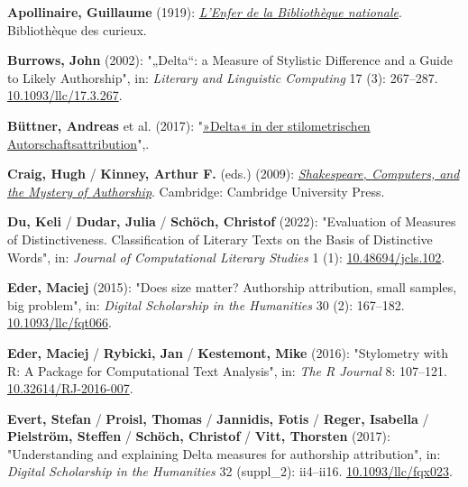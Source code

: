 \documentclass[
  12pt,
  letterpaper,
]{classicthesis}
\newlength{\cslhangindent}
\newenvironment{CSLReferences}[2] %
 {\begin{list}{}{%
  \setlength{\itemindent}{0pt}
  \setlength{\leftmargin}{0pt}
  \setlength{\parsep}{0pt}
  \ifodd #1
   \setlength{\leftmargin}{\cslhangindent}
   \setlength{\itemindent}{-1\cslhangindent}
  \fi
  \setlength{\itemsep}{#2\baselineskip}}}
 {\end{list}}
\begin{document}
\label{refs}
\begin{CSLReferences}{1}{0}
\textbf{Apollinaire, Guillaume} (1919):
\emph{\href{https://fr.wikisource.org/wiki/Livre:Apollinaire_-_L\%E2\%80\%99Enfer_de_la_Biblioth\%C3\%A8que_nationale.djvu}{L'{Enfer}
de la {Bibliothèque} nationale}}. Bibliothèque des curieux.

\textbf{Burrows, John} (2002): "{„{Delta}``}: a {Measure} of {Stylistic}
{Difference} and a {Guide} to {Likely} {Authorship}", in: \emph{Literary
and Linguistic Computing} 17 (3): 267--287.
\href{https://doi.org/10.1093/llc/17.3.267}{10.1093/llc/17.3.267}.

\textbf{Büttner, Andreas} et al. (2017):
"\href{http://dx.doi.org/10.17175/2017_006}{»{Delta}« in der
stilometrischen {Autorschaftsattribution}}",.

\textbf{Craig, Hugh} / \textbf{Kinney, Arthur F.} (eds.) (2009):
\emph{\href{https://doi.org/10.1017/CBO9780511605437}{Shakespeare,
{Computers}, and the {Mystery} of {Authorship}}}. Cambridge: Cambridge
University Press.

\textbf{Du, Keli} / \textbf{Dudar, Julia} / \textbf{Schöch, Christof}
(2022): "Evaluation of {Measures} of {Distinctiveness}. {Classification}
of {Literary} {Texts} on the {Basis} of {Distinctive} {Words}", in:
\emph{Journal of Computational Literary Studies} 1 (1):
\href{https://doi.org/10.48694/jcls.102}{10.48694/jcls.102}.

\textbf{Eder, Maciej} (2015): "Does size matter? {Authorship}
attribution, small samples, big problem", in: \emph{Digital Scholarship
in the Humanities} 30 (2): 167--182.
\href{https://doi.org/10.1093/llc/fqt066}{10.1093/llc/fqt066}.

\textbf{Eder, Maciej} / \textbf{Rybicki, Jan} / \textbf{Kestemont, Mike}
(2016): "Stylometry with {R}: {A} {Package} for {Computational} {Text}
{Analysis}", in: \emph{The R Journal} 8: 107--121.
\href{https://doi.org/10.32614/RJ-2016-007}{10.32614/RJ-2016-007}.

\textbf{Evert, Stefan} / \textbf{Proisl, Thomas} / \textbf{Jannidis,
Fotis} / \textbf{Reger, Isabella} / \textbf{Pielström, Steffen} /
\textbf{Schöch, Christof} / \textbf{Vitt, Thorsten} (2017):
"Understanding and explaining {Delta} measures for authorship
attribution", in: \emph{Digital Scholarship in the Humanities} 32
(suppl\_2): ii4--ii16.
\href{https://doi.org/10.1093/llc/fqx023}{10.1093/llc/fqx023}.


\end{CSLReferences}
\end{document}
